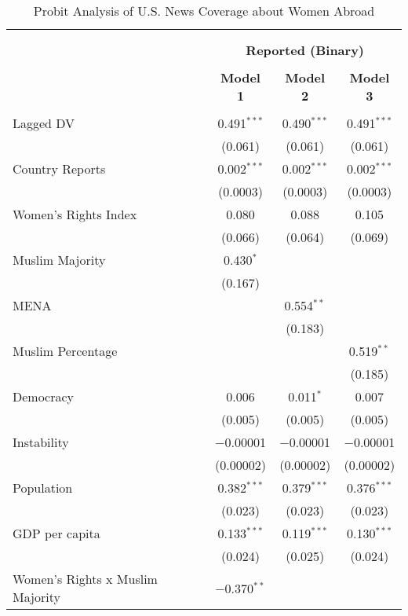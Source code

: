 
\begin{table}[!htbp] \centering 
  \caption{Probit Analysis of U.S. News Coverage about Women Abroad} 
  \label{table:probit} 
\begin{tabular}{@{\extracolsep{5pt}}lccc} 
\\[-1.8ex]\hline \\[-1.8ex] 
\\[-1.8ex] & \multicolumn{3}{c}{\textbf{Reported (Binary)}} \\ 
\\[-1.8ex] & \textbf{Model 1} & \textbf{Model 2} & \textbf{Model 3}\\ 
\hline \\[-1.8ex] 
 Lagged DV & 0.491$^{***}$ & 0.490$^{***}$ & 0.491$^{***}$ \\ 
  & (0.061) & (0.061) & (0.061) \\ 
  Country Reports & 0.002$^{***}$ & 0.002$^{***}$ & 0.002$^{***}$ \\ 
  & (0.0003) & (0.0003) & (0.0003) \\ 
  Women's Rights Index & 0.080 & 0.088 & 0.105 \\ 
  & (0.066) & (0.064) & (0.069) \\ 
  Muslim Majority & 0.430$^{*}$ &  &  \\ 
  & (0.167) &  &  \\ 
  MENA &  & 0.554$^{**}$ &  \\ 
  &  & (0.183) &  \\ 
  Muslim Percentage &  &  & 0.519$^{**}$ \\ 
  &  &  & (0.185) \\ 
  Democracy & 0.006 & 0.011$^{*}$ & 0.007 \\ 
  & (0.005) & (0.005) & (0.005) \\ 
  Instability & $-$0.00001 & $-$0.00001 & $-$0.00001 \\ 
  & (0.00002) & (0.00002) & (0.00002) \\ 
  Population & 0.382$^{***}$ & 0.379$^{***}$ & 0.376$^{***}$ \\ 
  & (0.023) & (0.023) & (0.023) \\ 
  GDP per capita & 0.133$^{***}$ & 0.119$^{***}$ & 0.130$^{***}$ \\ 
  & (0.024) & (0.025) & (0.024) \\ 
  Women's Rights x Muslim Majority & $-$0.370$^{**}$ &  &  \\ 

\end{tabular}
\end{table}

